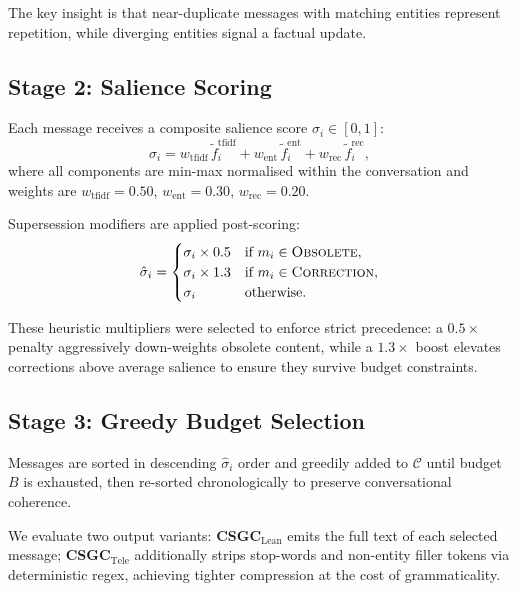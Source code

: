 \documentclass[conference]{IEEEtran}
\newcommand{\lean}{\textsc{CSGC}$_{\text{Lean}}$}
\newcommand{\tele}{\textsc{CSGC}$_{\text{Tele}}$}
\begin{document}
The key insight is that near-duplicate messages with matching entities
represent repetition, while diverging entities signal a factual update.

\subsection{Stage 2: Salience Scoring}
\label{ssec:salience}

Each message receives a composite salience score $\sigma_i \in [0,1]$:
\begin{equation}
  \sigma_i = w_\text{tfidf}\,\tilde{f}_i^{\text{tfidf}}
           + w_\text{ent}\,\tilde{f}_i^{\text{ent}}
           + w_\text{rec}\,\tilde{f}_i^{\text{rec}},
\end{equation}
where all components are min-max normalised within the conversation and
weights are $w_\text{tfidf}\!=\!0.50$, $w_\text{ent}\!=\!0.30$,
$w_\text{rec}\!=\!0.20$.

Supersession modifiers are applied post-scoring:
\begin{equation}
  \hat{\sigma}_i = \begin{cases}
    \sigma_i \times 0.5 & \text{if } m_i \in \textsc{Obsolete},\\
    \sigma_i \times 1.3 & \text{if } m_i \in \textsc{Correction},\\
    \sigma_i             & \text{otherwise.}
  \end{cases}
\end{equation}

These heuristic multipliers were selected to enforce strict precedence: a $0.5\times$ penalty aggressively down-weights obsolete content, while a $1.3\times$ boost elevates corrections above average salience to ensure they survive budget constraints.

\subsection{Stage 3: Greedy Budget Selection}
\label{ssec:selection}

Messages are sorted in descending $\hat{\sigma}_i$ order and greedily added
to $\mathcal{C}$ until budget $B$ is exhausted, then re-sorted
chronologically to preserve conversational coherence.

We evaluate two output variants:
\textbf{\lean{}} emits the full text of each selected message;
\textbf{\tele{}} additionally strips stop-words and non-entity filler tokens
via deterministic regex, achieving tighter compression at the cost of
grammaticality.
\end{document}
